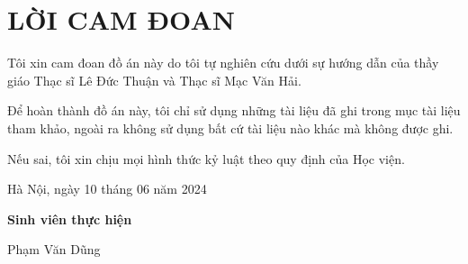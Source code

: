 
\chapter*{LỜI CAM ĐOAN}

Tôi xin cam đoan đồ án này do tôi tự nghiên cứu dưới sự hướng dẫn của thầy giáo Thạc sĩ Lê Đức Thuận và Thạc sĩ Mạc Văn Hải.

Để hoàn thành đồ án này, tôi chỉ sử dụng những tài liệu đã ghi trong mục tài liệu tham khảo, ngoài ra không sử dụng bất cứ tài liệu nào khác mà không được ghi.

Nếu sai, tôi xin chịu mọi hình thức kỷ luật theo quy định của Học viện.

\begin{flushleft}        
	\hspace{8cm}
	Hà Nội, ngày 10 tháng 06 năm 2024
	
	\hspace{9.5cm}
	\textbf{Sinh viên thực hiện}

	
	\vspace {2cm}
	
	\hspace{10cm}
	Phạm Văn Dũng
	
	\vfill	
\end{flushleft}